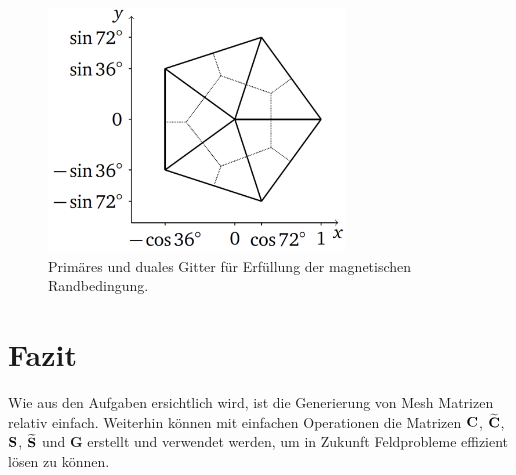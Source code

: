 \documentclass[Protokollheft.tex]{subfiles}
\begin{document}
\begin{figure}[h]
	\centering
	\includegraphics[width=0.7\textwidth]{mgn_Rand_2.pdf}
	\caption{Primäres und duales Gitter für Erfüllung der magnetischen Randbedingung.}
	\label{Abb:mgn_Rand_2}
\end{figure}

\section{Fazit}
Wie aus den Aufgaben ersichtlich wird, ist die Generierung von Mesh Matrizen relativ einfach. Weiterhin können mit einfachen Operationen die Matrizen $\mathbf{C}$, $\widetilde{\mathbf{C}}$, $\mathbf{S}$, $\widetilde{\mathbf{S}}$ und $\mathbf{G}$ erstellt und verwendet werden, um in Zukunft Feldprobleme effizient lösen zu können. 
\end{document}
